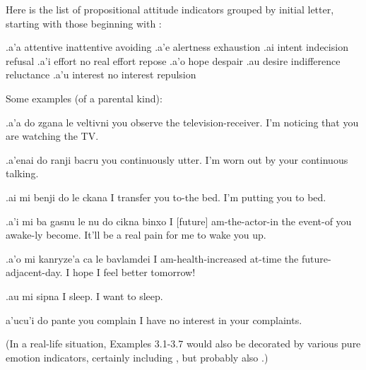 Here is the list of propositional attitude indicators
    grouped by initial letter, starting with those beginning with
    :

   .a'a    attentive   inattentive avoiding
    .a'e    alertness           exhaustion
    .ai intent      indecision  refusal
    .a'i    effort      no real effort  repose
    .a'o    hope                despair
    .au desire      indifference    reluctance
    .a'u    interest    no interest repulsion

Some examples (of a parental kind):
\begin{example}
.a'a do zgana le veltivni\n
{} you observe the television-receiver.\n
I'm noticing that you are watching the TV.
\end{example}

\begin{example}
.a'enai do ranji bacru\n
{} you continuously utter.\n
I'm worn out by your continuous talking.
\end{example}

\begin{example}
.ai mi benji do le ckana\n
{} I transfer you to-the bed.\n
I'm putting you to bed.
\end{example}

\begin{example}
.a'i mi ba gasnu\n
\T	le nu do cikna binxo\n
{} I [future] am-the-actor-in\n
\T	the event-of you awake-ly become.\n
It'll be a real pain for me to wake you up.
\end{example}

\begin{example}
.a'o mi kanryze'a\n
\T	ca le bavlamdei\n
{} I am-health-increased at-time\n
\T	the future-adjacent-day.\n
I hope I feel better tomorrow!
\end{example}

\begin{example}
.au mi sipna\n
{} I sleep.\n
I want to sleep.
\end{example}

\begin{example}
a'ucu'i do pante\n
{} you complain\n
I have no interest in your complaints.
\end{example}

(In a real-life situation, Examples 3.1-3.7 would also be
    decorated by various pure emotion indicators, certainly
    including , but probably also .) 

